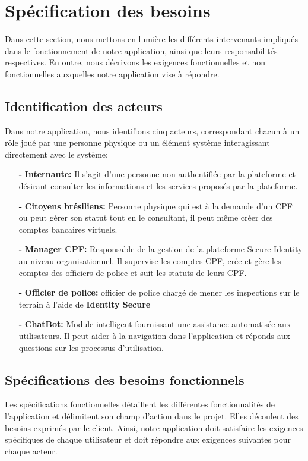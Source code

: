 \section{Spécification des besoins}
Dans cette section, nous mettons en lumière les différents intervenants impliqués dans le fonctionnement de notre application, ainsi que leurs responsabilités respectives. En outre, nous décrivons les exigences fonctionnelles et non fonctionnelles auxquelles notre application vise à répondre.

\subsection{Identification des acteurs}
Dans notre application, nous identifions cinq acteurs, correspondant chacun à un rôle joué par une personne physique ou un élément système interagissant directement avec le système:

\begin{itemize}
  \item[\textbf{-}] \textbf{Internaute:} Il s'agit d'une personne non authentifiée par la plateforme et désirant consulter les informations et les services proposés par la plateforme.

  \item[\textbf{-}] \textbf{Citoyens brésiliens:} Personne physique qui est à la demande d'un CPF ou peut gérer son statut tout en le consultant, il peut même créer des comptes bancaires virtuels.

  \item[\textbf{-}] \textbf{Manager CPF:} Responsable de la gestion de la plateforme Secure Identity au niveau organisationnel. Il supervise les comptes CPF, crée et gère les comptes des officiers de police et suit les statuts de leurs CPF.

  \item[\textbf{-}] \textbf{Officier de police:}  officier de police chargé de mener les inspections sur le terrain à l'aide de \textbf{Identity Secure}

  \item[\textbf{-}] \textbf{ChatBot:} Module intelligent fournissant une assistance automatisée aux utilisateurs. Il peut aider à la navigation dans l'application et réponds aux questions sur les processus d'utilisation.
\end{itemize}
\subsection{Spécifications des besoins fonctionnels}
Les spécifications fonctionnelles détaillent les différentes fonctionnalités de l'application et délimitent son champ d'action dans le projet. Elles découlent des besoins exprimés par le client. Ainsi, notre application doit satisfaire les exigences spécifiques de chaque utilisateur et doit répondre aux exigences suivantes pour chaque acteur.
\\
